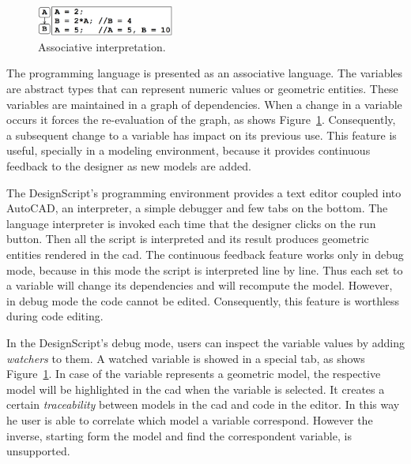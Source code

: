 \begin{figure}
  \vspace{-25pt}
  \begin{center}
    \includegraphics[width=0.4\textwidth]{img/designscript}
  \end{center}
  \vspace{-20pt}
 \caption{Associative interpretation.}  
  \vspace{-20pt}
    \label{fig:designscript}
\end{figure}

The programming language is presented as an associative language. The variables are abstract types that can represent numeric values or geometric entities. These variables are maintained in a graph of dependencies. When a change in a variable occurs it forces the re-evaluation of the graph, as shows Figure~\ref{fig:designscript}. Consequently, a subsequent change to a variable has impact on its previous use. This feature is useful, specially in a modeling environment, because it provides continuous feedback to the designer as new models are added.

The DesignScript's programming environment provides a text editor coupled into AutoCAD, an interpreter, a simple debugger and few tabs on the bottom. The language interpreter is invoked each time that the designer clicks on the run button. Then all the script is interpreted and its result produces geometric entities rendered in the \ac{cad}. The continuous feedback feature works only in debug mode, because in this mode the script is interpreted line by line. Thus each set to a variable will change its dependencies and will recompute the model. However, in debug mode the code cannot be edited. Consequently, this feature is worthless during code editing.

In the DesignScript's debug mode, users can inspect the variable values by adding \textit{watchers} to them. A watched variable is showed in a special tab, as shows Figure~\ref{fig:designscript}. In case of the variable represents a geometric model, the respective model will be highlighted in the \ac{cad} when the variable is selected. It creates a certain \textit{traceability} between models in the \ac{cad} and code in the editor. In this way he user is able to correlate which model a variable correspond. However the inverse, starting form the model and find the correspondent variable, is unsupported.

